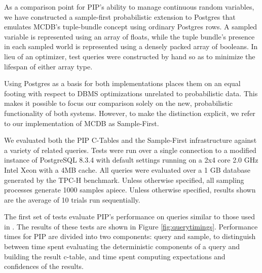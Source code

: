 As a comparison point for PIP's ability to manage continuous random variables, we have constructed a sample-first probabilistic extension to Postgres that emulates MCDB's tuple-bundle concept using ordinary Postgres rows.  A sampled variable is represented using an array of floats, while the tuple bundle's presence in each sampled world is represented using a densely packed array of booleans.  In lieu of an optimizer, test queries were constructed by hand so as to minimize the lifespan of either array type.

Using Postgres as a basis for both implementations places them on an equal footing with respect to DBMS optimizations unrelated to probabilistic data.  This makes it possible to focus our comparison solely on the new, probabilistic functionality of both systems.  However, to make the distinction explicit, we refer to our implementation of MCDB as Sample-First.

We evaluated both the PIP C-Tables and the Sample-First infrastructure against a variety of related queries.  Tests were run over a single connection to a modified instance of PostgreSQL 8.3.4 with default settings running on a 2x4 core 2.0 GHz Intel Xeon with a 4MB cache.  All queries were evaluated over a 1 GB database generated by the TPC-H benchmark.  Unless otherwise specified, all sampling processes generate 1000 samples apiece.  Unless otherwise specified, results shown are the average of 10 trials run sequentially.  

The first set of tests evaluate PIP's performance on queries similar to those used in \cite{MCDB}.  The results of these tests are shown in Figure \ref{fig:querytimings}.  Performance times for PIP are divided into two components: query and sample, to distinguish between time spent evaluating the deterministic components of a query and building the result c-table, and time spent computing expectations and confidences of the results.

